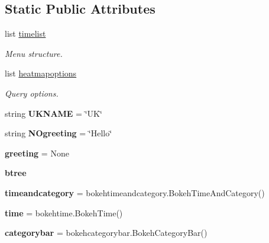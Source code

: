 \subsection*{Static Public Attributes}
\begin{DoxyCompactItemize}
\item 
list \mbox{\hyperlink{classboks_1_1Boks_a67b4fd373cab28d7c43584ee0b1daa48}{timelist}}
\begin{DoxyCompactList}\small\item\em Menu structure. \end{DoxyCompactList}\item 
list \mbox{\hyperlink{classboks_1_1Boks_adaa67dad916652354533a02b778e8495}{heatmapoptions}}
\begin{DoxyCompactList}\small\item\em Query options. \end{DoxyCompactList}\item 
\mbox{\label{classboks_1_1Boks_af027e5d8210f545322a6ae21382a0bbf}} 
string {\bfseries U\+K\+N\+A\+ME} = \char`\"{}UK\char`\"{}
\item 
\mbox{\label{classboks_1_1Boks_ac15093e3209c7372e95be546de1ca79a}} 
string {\bfseries N\+Ogreeting} = \char`\"{}Hello\char`\"{}
\item 
\mbox{\label{classboks_1_1Boks_ad07bcac2d3c828aab9d9a807cdb79a7b}} 
{\bfseries greeting} = None
\item 
\mbox{\label{classboks_1_1Boks_af82e3f6ccf646fba683ea632ff470658}} 
{\bfseries btree}
\item 
\mbox{\label{classboks_1_1Boks_ae71c1536997cac7a85acb73e8d2789f4}} 
{\bfseries timeandcategory} = bokehtimeandcategory.\+Bokeh\+Time\+And\+Category()
\item 
\mbox{\label{classboks_1_1Boks_abe25ffd3f985ad6941e447ab23113657}} 
{\bfseries time} = bokehtime.\+Bokeh\+Time()
\item 
\mbox{\label{classboks_1_1Boks_a1e65d870a77eb265826520794ab3243c}} 
{\bfseries categorybar} = bokehcategorybar.\+Bokeh\+Category\+Bar()
\item 
\mbox{\label{classboks_1_1Boks_a932b35649f8a6b66edfad2bcf336c0a0}} 

\end{DoxyCompactItemize}
